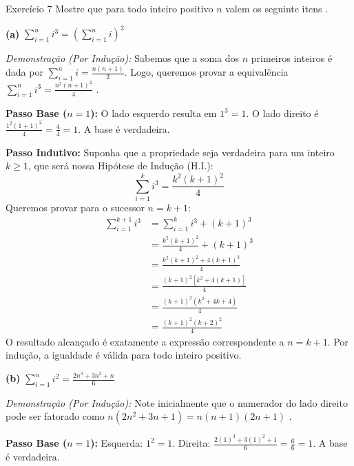 \documentclass[a4paper,11pt]{article}
\theoremstyle{definition}
\theoremstyle{plain}
\theoremstyle{remark}
\newcounter{questao}[section]
\begin{document}
\newpage \begin{questaoManually}{Exercício 7}
Mostre que para todo inteiro positivo $n$ valem os seguinte itens .

\textbf{(a)} $\sum_{i=1}^n i^3 = \left( \sum_{i=1}^n i \right)^2$

\textit{Demonstração (Por Indução):}
Sabemos que a soma dos $n$ primeiros inteiros é dada por $\sum_{i=1}^n i = \frac{n(n+1)}{2}$. Logo, queremos provar a equivalência $\sum_{i=1}^n i^3 = \frac{n^2(n+1)^2}{4}$ .

\textbf{Passo Base ($n=1$):}
O lado esquerdo resulta em $1^3 = 1$. O lado direito é $\frac{1^2(1+1)^2}{4} = \frac{4}{4} = 1$. A base é verdadeira.

\textbf{Passo Indutivo:}
Suponha que a propriedade seja verdadeira para um inteiro $k \ge 1$, que será nossa Hipótese de Indução (H.I.):
\begin{equation}
\sum_{i=1}^k i^3 = \frac{k^2(k+1)^2}{4}
\end{equation}
Queremos provar para o sucessor $n = k+1$:
\begin{align*}
\sum_{i=1}^{k+1} i^3 &= \sum_{i=1}^k i^3 + (k+1)^3 \\
&= \frac{k^2(k+1)^2}{4} + (k+1)^3 \tag{Substituição da H.I.} \\
&= \frac{k^2(k+1)^2 + 4(k+1)^3}{4} \\
&= \frac{(k+1)^2 [k^2 + 4(k+1)]}{4} \tag{Colocando $(k+1)^2$ em evidência} \\
&= \frac{(k+1)^2 (k^2 + 4k + 4)}{4} \\
&= \frac{(k+1)^2 (k+2)^2}{4}
\end{align*}
O resultado alcançado é exatamente a expressão correspondente a $n = k+1$. Por indução, a igualdade é válida para todo inteiro positivo. \blacksquare
\bigskip

\textbf{(b)} $\sum_{i=1}^n i^2 = \frac{2n^3 + 3n^2 + n}{6}$

\textit{Demonstração (Por Indução):}
Note inicialmente que o numerador do lado direito pode ser fatorado como $n(2n^2 + 3n + 1) = n(n+1)(2n+1)$ . 

\textbf{Passo Base ($n=1$):}
Esquerda: $1^2 = 1$. Direita: $\frac{2(1)^3 + 3(1)^2 + 1}{6} = \frac{6}{6} = 1$. A base é verdadeira.


\end{questaoManually}
\end{document}
